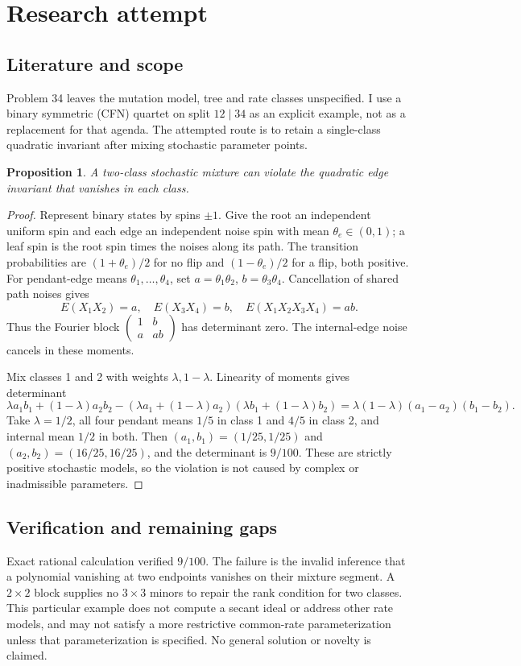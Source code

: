 \documentclass[11pt]{article}
\newtheorem{proposition}{Proposition}
\begin{document}
\section{Research attempt}
\subsection{Literature and scope}
Problem 34 leaves the mutation model, tree and rate classes unspecified. I use a binary symmetric (CFN) quartet on split $12\mid34$ as an explicit example, not as a replacement for that agenda. The attempted route is to retain a single-class quadratic invariant after mixing stochastic parameter points.
\begin{proposition}
A two-class stochastic mixture can violate the quadratic edge invariant that vanishes in each class.
\end{proposition}
\begin{proof}
Represent binary states by spins $\pm1$. Give the root an independent uniform spin and each edge an independent noise spin with mean $\theta_e\in(0,1)$; a leaf spin is the root spin times the noises along its path. The transition probabilities are $(1+\theta_e)/2$ for no flip and $(1-\theta_e)/2$ for a flip, both positive. For pendant-edge means $\theta_1,\ldots,\theta_4$, set $a=\theta_1\theta_2$, $b=\theta_3\theta_4$. Cancellation of shared path noises gives
\[
E(X_1X_2)=a,\quad E(X_3X_4)=b,\quad E(X_1X_2X_3X_4)=ab.
\]
Thus the Fourier block $\left(\begin{smallmatrix}1&b\\a&ab\end{smallmatrix}\right)$ has determinant zero. The internal-edge noise cancels in these moments.

Mix classes 1 and 2 with weights $\lambda,1-\lambda$. Linearity of moments gives determinant
\[
\lambda a_1b_1+(1-\lambda)a_2b_2-
(\lambda a_1+(1-\lambda)a_2)(\lambda b_1+(1-\lambda)b_2)
=\lambda(1-\lambda)(a_1-a_2)(b_1-b_2).
\]
Take $\lambda=1/2$, all four pendant means $1/5$ in class 1 and $4/5$ in class 2, and internal mean $1/2$ in both. Then $(a_1,b_1)=(1/25,1/25)$ and $(a_2,b_2)=(16/25,16/25)$, and the determinant is $9/100$. These are strictly positive stochastic models, so the violation is not caused by complex or inadmissible parameters.
\end{proof}
\subsection{Verification and remaining gaps}
Exact rational calculation verified $9/100$. The failure is the invalid inference that a polynomial vanishing at two endpoints vanishes on their mixture segment. A $2\times2$ block supplies no $3\times3$ minors to repair the rank condition for two classes. This particular example does not compute a secant ideal or address other rate models, and may not satisfy a more restrictive common-rate parameterization unless that parameterization is specified. No general solution or novelty is claimed.
\end{document}

